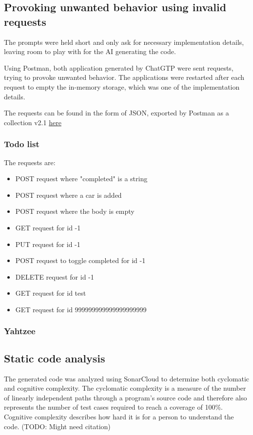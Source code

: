 \documentclass[a4paper]{article}
\begin{document}
\subsection{Provoking unwanted behavior using invalid requests}
The prompts were held short and only ask for necessary implementation details,
leaving room to play with for the AI generating the code.

Using Postman, both application generated by ChatGTP were sent requests, trying
to provoke unwanted behavior. The applications were restarted after each request
to empty the in-memory storage, which was one of the implementation details.

The requests can be found in the form of JSON, exported by Postman as a
collection v2.1
\hyperlink{https://github.com/lerchl/curryful-bachelor-thesis-postman-requests}{here}
\newline

\subsubsection{Todo list}
\noindent The requests are:
\begin{itemize}
	\item POST request where "completed" is a string
	\item POST request where a car is added
	\item POST request where the body is empty
	\item GET request for id -1
	\item PUT request for id -1
	\item POST request to toggle completed for id -1
	\item DELETE request for id -1
	\item GET request for id test
	\item GET request for id 999999999999999999999
\end{itemize}

\subsubsection{Yahtzee}

\subsection{Static code analysis}
The generated code was analyzed using SonarCloud to determine both cyclomatic
and cognitive complexity. The cyclomatic complexity is a measure of the number
of linearly independent paths through a program's source code and therefore also
represents the number of test cases required to reach a coverage of 100\%.
Cognitive complexity describes how hard it is for a person to understand the
code. (TODO: Might need citation) \newline
\end{document}
